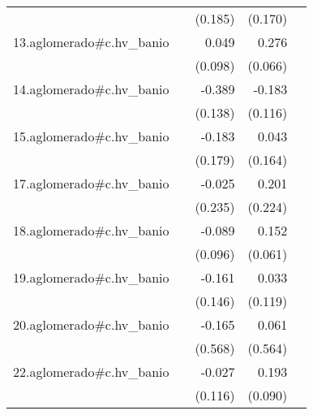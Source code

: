 {\begin{longtable}{l*{4}{D{.}{.}{-1}}}
            &                     &     (0.185)         &     (0.170)         &                     \\
\addlinespace
13.aglomerado#c.hv\_banio&                     &       0.049         &       0.276\sym{***}&                     \\
            &                     &     (0.098)         &     (0.066)         &                     \\
\addlinespace
14.aglomerado#c.hv\_banio&                     &      -0.389\sym{**} &      -0.183         &                     \\
            &                     &     (0.138)         &     (0.116)         &                     \\
\addlinespace
15.aglomerado#c.hv\_banio&                     &      -0.183         &       0.043         &                     \\
            &                     &     (0.179)         &     (0.164)         &                     \\
\addlinespace
17.aglomerado#c.hv\_banio&                     &      -0.025         &       0.201         &                     \\
            &                     &     (0.235)         &     (0.224)         &                     \\
\addlinespace
18.aglomerado#c.hv\_banio&                     &      -0.089         &       0.152\sym{*}  &                     \\
            &                     &     (0.096)         &     (0.061)         &                     \\
\addlinespace
19.aglomerado#c.hv\_banio&                     &      -0.161         &       0.033         &                     \\
            &                     &     (0.146)         &     (0.119)         &                     \\
\addlinespace
20.aglomerado#c.hv\_banio&                     &      -0.165         &       0.061         &                     \\
            &                     &     (0.568)         &     (0.564)         &                     \\
\addlinespace
22.aglomerado#c.hv\_banio&                     &      -0.027         &       0.193\sym{*}  &                     \\
            &                     &     (0.116)         &     (0.090)         &                     \\

\end{longtable}}
